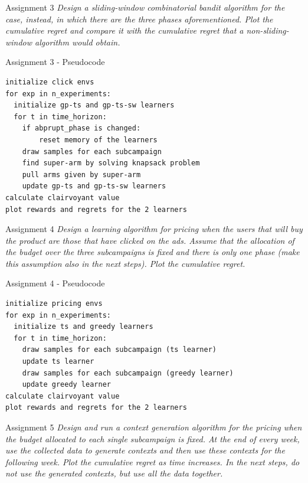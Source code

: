 \documentclass[11pt]{beamer}
\begin{document}
\begin{frame}{Assignment 3}
\textit{Design a sliding-window combinatorial bandit algorithm for the case, instead, in which there are the three phases aforementioned. Plot the cumulative regret and compare it with the cumulative regret that a non-sliding-window algorithm would obtain.}
\end{frame}

\begin{frame}[fragile]{Assignment 3 - Pseudocode}
\begin{lstlisting}
initialize click envs
for exp in n_experiments:
  initialize gp-ts and gp-ts-sw learners 
  for t in time_horizon:
  	if abprupt_phase is changed:
  		reset memory of the learners
    draw samples for each subcampaign
    find super-arm by solving knapsack problem
    pull arms given by super-arm
    update gp-ts and gp-ts-sw learners
calculate clairvoyant value
plot rewards and regrets for the 2 learners
\end{lstlisting}
\end{frame}

\begin{frame}{Assignment 4}
\textit{Design a learning algorithm for pricing when the users that will buy the product are those that have clicked on the ads. Assume that the allocation of the budget over the three subcampaigns is fixed and there is only one phase (make this assumption also in the next steps). Plot the cumulative regret.}
\end{frame}

\begin{frame}[fragile]{Assignment 4 - Pseudocode}
\begin{lstlisting}
initialize pricing envs
for exp in n_experiments:
  initialize ts and greedy learners 
  for t in time_horizon:
    draw samples for each subcampaign (ts learner)
    update ts learner
    draw samples for each subcampaign (greedy learner)
    update greedy learner
calculate clairvoyant value
plot rewards and regrets for the 2 learners
\end{lstlisting}
\end{frame}

\begin{frame}{Assignment 5}
\textit{Design and run a context generation algorithm for the pricing when the budget allocated to each single subcampaign is fixed. At the end of every week, use the collected data to generate contexts and then use these contexts for the following week. Plot the cumulative regret as time increases. In the next steps, do not use the generated contexts, but use all the data together.}
\end{frame}
\end{document}
